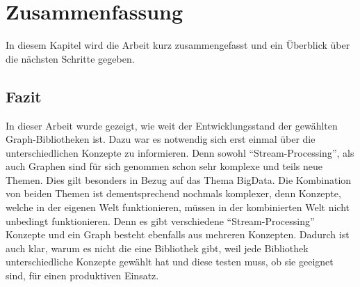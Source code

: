 \chapter{Zusammenfassung}
In diesem Kapitel wird die Arbeit kurz zusammengefasst und ein Überblick über
die nächsten Schritte gegeben.

\section{Fazit}
In dieser Arbeit wurde gezeigt, wie weit der Entwicklungsstand der gewählten
Graph-Bibliotheken ist. Dazu war es notwendig sich erst einmal über die
unterschiedlichen Konzepte zu informieren. Denn sowohl \enquote{Stream-Processing},
als auch Graphen sind für sich genommen schon sehr komplexe und teils neue Themen.
Dies gilt besonders in Bezug auf das Thema \gls{BigData}. Die Kombination von
beiden Themen ist dementsprechend nochmals komplexer, denn Konzepte, welche in
der eigenen Welt funktionieren, müssen in der kombinierten Welt nicht unbedingt
funktionieren. Denn es gibt verschiedene \enquote{Stream-Processing} Konzepte und
ein Graph besteht ebenfalls aus mehreren Konzepten. Dadurch ist auch klar, warum
es nicht die eine Bibliothek gibt, weil jede Bibliothek unterschiedliche Konzepte
gewählt hat und diese testen muss, ob sie geeignet sind, für einen produktiven
Einsatz.


